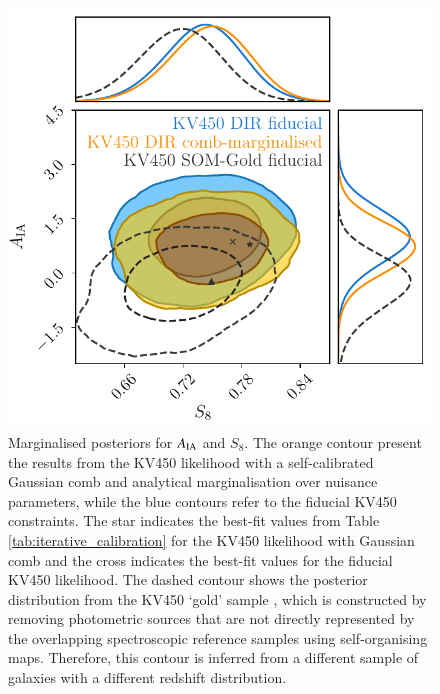 \documentclass{aa}
\begin{document}
\begin{figure}
\centering
\includegraphics[width=\linewidth]{plots/AIA_vs_S8}
\caption{Marginalised posteriors for $A_{\rm IA}$ and $S_8$. The orange contour present the results from the KV450 likelihood with a self-calibrated Gaussian comb and analytical marginalisation over nuisance parameters, while the blue contours refer to the fiducial KV450 constraints. The star indicates the best-fit values from Table \ref{tab:iterative_calibration} for the KV450 likelihood with Gaussian comb and the cross indicates the best-fit values for the fiducial KV450 likelihood. The dashed contour shows the posterior distribution from the KV450 `gold' sample \citep{wright_som_kv450}, which is constructed by removing photometric sources that are not directly represented by the overlapping spectroscopic reference samples using self-organising maps. Therefore, this contour is inferred from a different sample of galaxies with a different redshift distribution.}
\label{fig:AIA_vs_S8}
\end{figure}
\end{document}
